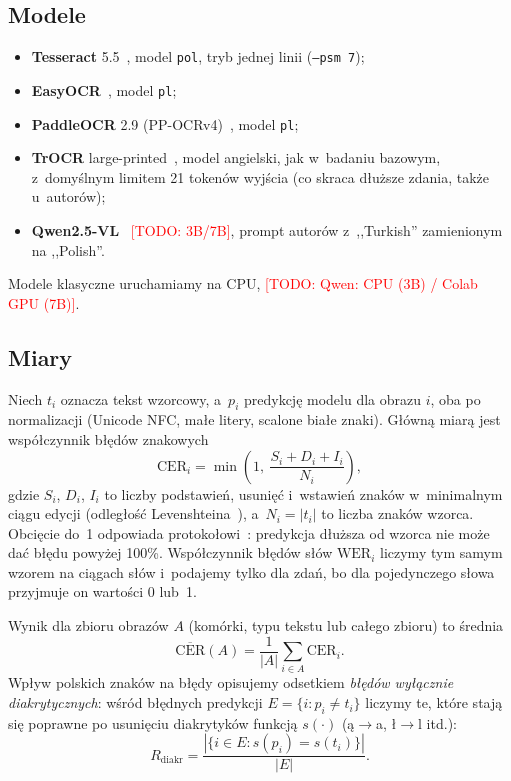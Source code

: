 \documentclass[runningheads]{llncs}
\newcommand{\TODO}[1]{\textcolor{red}{[TODO: #1]}}
\begin{document}
\subsection{Modele}
\begin{itemize}
  \item \textbf{Tesseract} 5.5~\cite{smith2007}, model \texttt{pol}, tryb jednej linii (\texttt{--psm 7});
  \item \textbf{EasyOCR}~\cite{easyocr}, model \texttt{pl};
  \item \textbf{PaddleOCR} 2.9 (PP-OCRv4)~\cite{li2022ppocrv3}, model \texttt{pl};
  \item \textbf{TrOCR} large-printed~\cite{li2023trocr}, model angielski, jak w~badaniu bazowym,
    z~domyślnym limitem 21 tokenów wyjścia (co skraca dłuższe zdania, także u~autorów);
  \item \textbf{Qwen2.5-VL}~\cite{bai2025qwen25vl} \TODO{3B/7B}, prompt autorów z~,,Turkish''
    zamienionym na ,,Polish''.
\end{itemize}
Modele klasyczne uruchamiamy na CPU, \TODO{Qwen: CPU (3B) / Colab GPU (7B)}.

\subsection{Miary}
Niech $t_i$ oznacza tekst wzorcowy, a~$p_i$ predykcję modelu dla obrazu $i$, oba po normalizacji
(Unicode NFC, małe litery, scalone białe znaki). Główną miarą jest współczynnik błędów znakowych
\begin{equation}\label{eq:cer}
  \mathrm{CER}_i = \min\left(1,\ \frac{S_i + D_i + I_i}{N_i}\right),
\end{equation}
gdzie $S_i$, $D_i$, $I_i$ to liczby podstawień, usunięć i~wstawień znaków w~minimalnym ciągu edycji
(odległość Levenshteina~\cite{levenshtein1966}), a~$N_i = |t_i|$ to liczba znaków wzorca. Obcięcie do~1
odpowiada protokołowi~\cite{yilmaz2026}: predykcja dłuższa od wzorca nie może dać błędu powyżej 100\%.
Współczynnik błędów słów $\mathrm{WER}_i$ liczymy tym samym wzorem na ciągach słów i~podajemy tylko dla
zdań, bo dla pojedynczego słowa przyjmuje on wartości 0 lub~1.

Wynik dla zbioru obrazów $A$ (komórki, typu tekstu lub całego zbioru) to średnia
\begin{equation}\label{eq:mean}
  \overline{\mathrm{CER}}(A) = \frac{1}{|A|}\sum_{i\in A}\mathrm{CER}_i .
\end{equation}
Wpływ polskich znaków na błędy opisujemy odsetkiem \emph{błędów wyłącznie diakrytycznych}: wśród błędnych
predykcji $E=\{i: p_i\neq t_i\}$ liczymy te, które stają się poprawne po usunięciu diakrytyków
funkcją $s(\cdot)$ (ą$\to$a, ł$\to$l itd.):
\begin{equation}\label{eq:diacr}
  R_{\mathrm{diakr}} = \frac{|\{i\in E: s(p_i) = s(t_i)\}|}{|E|}.
\end{equation}
\end{document}
